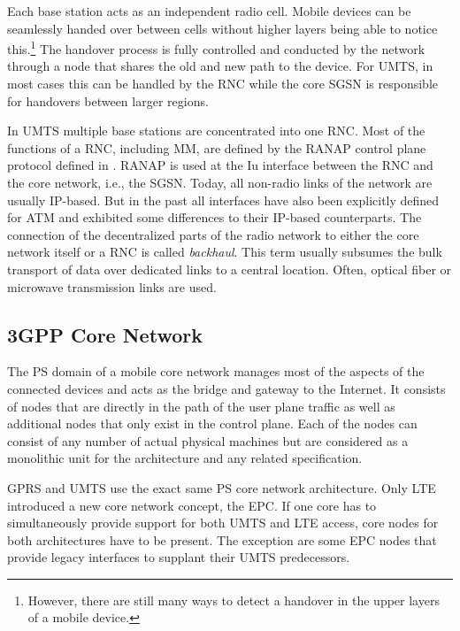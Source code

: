 Each base station acts as an independent radio cell. Mobile devices can be seamlessly handed over between cells without higher layers being able to notice this.\footnote{However, there are still many ways to detect a handover in the upper layers of a mobile device.} The handover process is fully controlled and conducted by the network through a node that shares the old and new path to the device. For \gls{UMTS}, in most cases this can be handled by the \gls{RNC} while the core \gls{SGSN} is responsible for handovers between larger regions.

In \gls{UMTS} multiple base stations are concentrated into one \gls{RNC}. Most of the functions of a \gls{RNC}, including \gls{MM}, are defined by the \gls{RANAP} control plane protocol defined in \cite{3gpp.25.413}. \gls{RANAP} is used at the Iu interface between the \gls{RNC} and the core network, i.e., the \gls{SGSN}. Today, all non-radio links of the network are usually \gls{IP}-based. But in the past all interfaces have also been explicitly defined for \gls{ATM} and exhibited some differences to their \gls{IP}-based counterparts. The connection of the decentralized parts of the radio network to either the core network itself or a \gls{RNC} is called \textit{backhaul}. This term usually subsumes the bulk transport of data over dedicated links to a central location. Often, optical fiber or microwave transmission links are used.


\subsection{\texorpdfstring{\acrshort{3GPP}}{3GPP} Core Network}

The \gls{PS} domain of a mobile core network manages most of the aspects of the connected devices and acts as the bridge and gateway to the Internet. It consists of nodes that are directly in the path of the user plane traffic as well as additional nodes that only exist in the control plane. Each of the nodes can consist of any number of actual physical machines but are considered as a monolithic unit for the architecture and any related specification.

\gls{GPRS} and \gls{UMTS} use the exact same \gls{PS} core network architecture. Only \gls{LTE} introduced a new core network concept, the \gls{EPC}. If one core has to simultaneously provide support for both \gls{UMTS} and \gls{LTE} access, core nodes for both architectures have to be present. The exception are some \gls{EPC} nodes that provide legacy interfaces to supplant their \gls{UMTS} predecessors.

